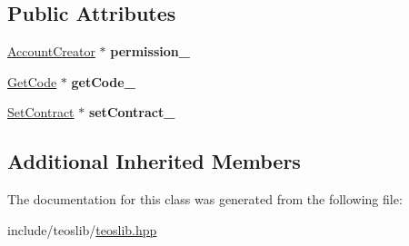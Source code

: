 \subsection*{Public Attributes}
\begin{DoxyCompactItemize}
\item 
\mbox{\label{classteoslib_1_1_account_af1131080cf08f479b1429dd46d141383}} 
\mbox{\hyperlink{classteoslib_1_1_account_creator}{Account\+Creator}} $\ast$ {\bfseries permission\+\_\+}
\item 
\mbox{\label{classteoslib_1_1_account_a0c5a7d913d0ed779d7f8b58adfa564d4}} 
\mbox{\hyperlink{classteos_1_1command_1_1_get_code}{Get\+Code}} $\ast$ {\bfseries get\+Code\+\_\+}
\item 
\mbox{\label{classteoslib_1_1_account_aa10eba476a0d489bf2af62a2fc6f4869}} 
\mbox{\hyperlink{classteos_1_1command_1_1_set_contract}{Set\+Contract}} $\ast$ {\bfseries set\+Contract\+\_\+}
\end{DoxyCompactItemize}
\subsection*{Additional Inherited Members}


The documentation for this class was generated from the following file\+:\begin{DoxyCompactItemize}
\item 
include/teoslib/\mbox{\hyperlink{teoslib_8hpp}{teoslib.\+hpp}}\end{DoxyCompactItemize}
